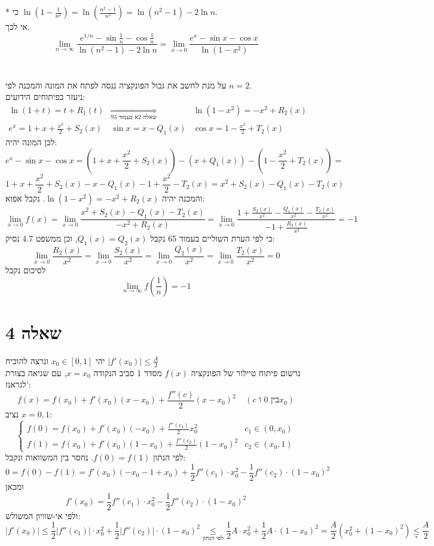 \documentclass{article}
\newcommand\underrel[2]{\mathrel{\mathop{#2}\limits_{#1}}}
\begin{document}
* כי $\ln(1-\frac{1}{n^2}) = \ln(\frac{n^2-1}{n^2})=\ln(n^2-1)-2\ln n$. \\
אי לכך,
\[
    \lim_{n\rightarrow\infty} \frac{e^{1/n} -\sin \frac{1}{n} -\cos \frac{1}{n}}{\ln(n^2-1)-2\ln n} =
    \lim_{x\rightarrow 0} \frac{e^x -\sin x-\cos x}{\ln(1-x^2)}
\]
\\\\
על מנת לחשב את גבול הפונקציה ננסה לפתח את המונה והמכנה לפי $n=2$. \\
ניעזר בפיתוחים הידועים:
\[
    \begin{matrix}
        \ln(1+t) = t + R_1(t)               & \underrel{\text{שאלה 2א בעמוד 93}}{\Rightarrow} & \ln(1-x^2)=-x^2+R_2(x) \\
        e^x = 1 + x + \frac{x^2}{2}+ S_2(x) &
        \sin x = x - Q_1(x)                 &
        \cos x = 1 - \frac{x^2}{2} + T_2(x)
    \end{matrix}
\]
לכן המונה יהיה:
\[
    e^x-\sin x - \cos x =
    (1 + x + \frac{x^2}{2}+ S_2(x)) - (x + Q_1(x)) - (1 - \frac{x^2}{2} + T_2(x)) =
\]
\[
    1+x+\frac{x^2}{2}+ S_2(x) - x - Q_1(x) - 1 + \frac{x^2}{2} - T_2(x)=
    x^2+S_2(x)-Q_1(x)-T_2(x)
\]
והמכנה יהיה $\ln(1-x^2)=-x^2+R_2(x)$. נקבל אפוא:
\[
    \lim_{x\rightarrow 0} f(x) =
    \lim_{x\rightarrow 0} \frac{x^2+S_2(x)-Q_1(x)-T_2(x)}{-x^2+R_2(x)} =
    \lim_{x\rightarrow 0} \frac{1+\frac{S_2(x)}{x^2}-\frac{Q_1(x)}{x^2}-\frac{T_2(x)}{x^2}}{-1+\frac{R_2(x)}{x^2}} = -1
\]
כי לפי הערת השוליים בעמוד 65 נקבל $Q_1(x)=Q_2(x)$, וכן ממשפט 4.7 נסיק:
\[
    \lim_{x\rightarrow 0} \frac{R_2(x)}{x^2} =
    \lim_{x\rightarrow 0} \frac{S_2(x)}{x^2} =
    \lim_{x\rightarrow 0} \frac{Q_2(x)}{x^2} =
    \lim_{x\rightarrow 0} \frac{T_2(x)}{x^2} = 0
\]
לסיכום נקבל
\[
    \lim_{n\rightarrow \infty} f(\frac{1}{n}) = -1
\]

\pagebreak

\section*{שאלה 4}

יהי $x_0\in [0,1]$ ונרצה להוכיח $|f'(x_0)|\leq \frac{A}{2}$ \\
נרשום פיתוח טיילור של הפונקציה $f(x)$ מסדר 1 סביב הנקודה $x=x_0$,
עם שגיאה בצורת לגראנז':
\[
    f(x)=f(x_0)+f'(x_0)(x-x_0)+\frac{f''(c)}{2}(x-x_0)^2 \;\;\;\; (\text{$c$ בין 0 ו$x_0$})
\]
נציב $x=0,1$:
\[
    \begin{cases}
        f(0)=f(x_0)+f'(x_0)(-x_0)+\frac{f''(c_1)}{2}x_0^2      & c_1\in (0,x_0) \\
        f(1)=f(x_0)+f'(x_0)(1-x_0)+\frac{f''(c_2)}{2}(1-x_0)^2 & c_2\in(x_0,1)
    \end{cases}
\]
לפי הנתון $f(0)=f(1)$. נחסר בין המשוואות ונקבל:
\[
    0=f(0)-f(1)=
    f'(x_0)(-x_0-1+x_0)+\frac{1}{2}f''(c_1)\cdot x_0^2 - \frac{1}{2}f''(c_2)\cdot (1-x_0)^2
\]
ומכאן
\[
    f'(x_0)=\frac{1}{2}f''(c_1)\cdot x_0^2 - \frac{1}{2}f''(c_2)\cdot (1-x_0)^2
\]
ולפי אי-שוויון המשולש:
\[
    |f'(x_0)|\leq
    \frac{1}{2} |f''(c_1)| \cdot x_0^2 + \frac{1}{2}|f''(c_2)|\cdot (1-x_0)^2 \underrel{\text{לפי הנתון}}{\leq}
    \frac{1}{2} A \cdot x_0^2 + \frac{1}{2}A\cdot (1-x_0)^2=
    \frac{A}{2} (x_0^2 + (1-x_0)^2)\underrel{\ast}{\leq} \frac{A}{2}
\]
\end{document}
